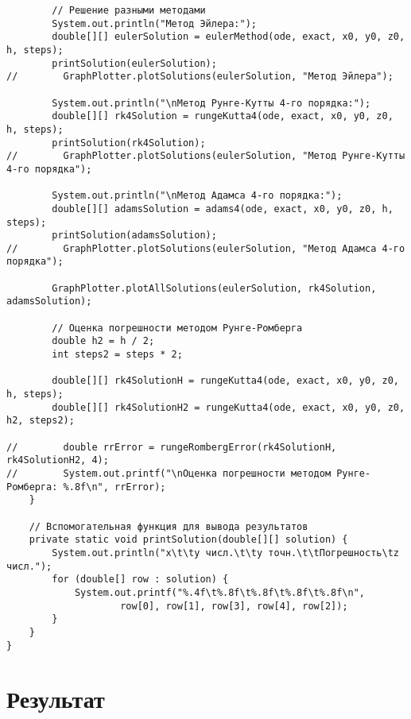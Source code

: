 \begin{verbatim}
        // Решение разными методами
        System.out.println("Метод Эйлера:");
        double[][] eulerSolution = eulerMethod(ode, exact, x0, y0, z0, h, steps);
        printSolution(eulerSolution);
//        GraphPlotter.plotSolutions(eulerSolution, "Метод Эйлера");

        System.out.println("\nМетод Рунге-Кутты 4-го порядка:");
        double[][] rk4Solution = rungeKutta4(ode, exact, x0, y0, z0, h, steps);
        printSolution(rk4Solution);
//        GraphPlotter.plotSolutions(eulerSolution, "Метод Рунге-Кутты 4-го порядка");

        System.out.println("\nМетод Адамса 4-го порядка:");
        double[][] adamsSolution = adams4(ode, exact, x0, y0, z0, h, steps);
        printSolution(adamsSolution);
//        GraphPlotter.plotSolutions(eulerSolution, "Метод Адамса 4-го порядка");

        GraphPlotter.plotAllSolutions(eulerSolution, rk4Solution, adamsSolution);

        // Оценка погрешности методом Рунге-Ромберга
        double h2 = h / 2;
        int steps2 = steps * 2;

        double[][] rk4SolutionH = rungeKutta4(ode, exact, x0, y0, z0, h, steps);
        double[][] rk4SolutionH2 = rungeKutta4(ode, exact, x0, y0, z0, h2, steps2);

//        double rrError = rungeRombergError(rk4SolutionH, rk4SolutionH2, 4);
//        System.out.printf("\nОценка погрешности методом Рунге-Ромберга: %.8f\n", rrError);
    }

    // Вспомогательная функция для вывода результатов
    private static void printSolution(double[][] solution) {
        System.out.println("x\t\ty числ.\t\ty точн.\t\tПогрешность\tz числ.");
        for (double[] row : solution) {
            System.out.printf("%.4f\t%.8f\t%.8f\t%.8f\t%.8f\n",
                    row[0], row[1], row[3], row[4], row[2]);
        }
    }
}
\end{verbatim}

\section*{Результат}

